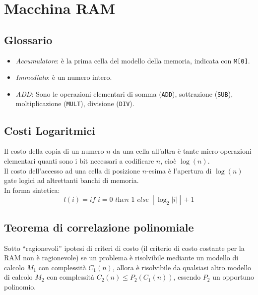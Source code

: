 \documentclass[10pt,a4paper]{article}
\newcommand{\code}{\texttt}
\begin{document}
\section*{Macchina RAM}
\begin{multicols}{2}
\subsection*{Glossario}
\begin{itemize}
    \item\textit{Accumulatore}: \`e la prima cella del modello della memoria, indicata con \code{M[0]}.
    \item\textit{Immediato}: \`e un numero intero.
    \item\textit{ADD}: Sono le operazioni elementari di somma (\code{ADD}), sottrazione (\code{SUB}), moltiplicazione (\code{MULT}), divisione (\code{DIV}).
\end{itemize}
\subsection*{Costi Logaritmici}
Il costo della copia di un numero $n$ da una cella all'altra \`e tante micro-operazioni elementari quanti sono i bit necessari a codificare $n$, cio\`e $\log(n)$.\\
Il costo dell'accesso ad una cella di posizione $n$-esima \`e l'apertura di $\log(n)$ gate logici ad altrettanti banchi di memoria.\\
In forma sintetica:
\begin{equation*}
    l(i) = \textit{if } i=0 \textit{ then } 1
    \textit{ else } \left\lfloor\log_2|i|\right\rfloor + 1
\end{equation*}

\subsection*{Teorema di correlazione polinomiale}
Sotto ``ragionevoli'' ipotesi di criteri di costo (il criterio di costo costante per la RAM non \`e ragionevole) se un problema \`e risolvibile mediante un modello di calcolo $M_1$ con complessit\`a $C_1(n)$, allora \`e risolvibile da qualsiasi altro modello di calcolo $M_2$ con complessit\`a $C_2(n) \le P_2(C_1(n))$, essendo $P_2$ un opportuno polinomio.
\end{multicols}
\end{document}
